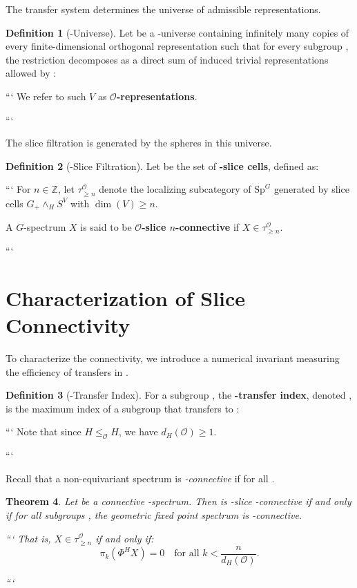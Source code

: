 \documentclass[11pt]{article}
\theoremstyle{plain}
\newtheorem{theorem}{Theorem}[section]
\theoremstyle{definition}
\newtheorem{definition}[theorem]{Definition}
\newcommand{\Ocal}{\mathcal{O}}
\newcommand{\SpG}{\mathrm{Sp}^G}
\newcommand{\Z}{\mathbb{Z}}
\newcommand{\slice}[1]{\tau_{\ge #1}^{\Ocal}}
\begin{document}
The transfer system determines the universe of admissible representations.

\begin{definition}[-Universe]
Let  be a -universe containing infinitely many copies of every finite-dimensional orthogonal representation  such that for every subgroup , the restriction  decomposes as a direct sum of induced trivial representations allowed by :

```
We refer to such $V$ as \textbf{$\Ocal$-representations}.

```

\end{definition}

The slice filtration is generated by the spheres in this universe.

\begin{definition}[-Slice Filtration]
Let  be the set of \textbf{-slice cells}, defined as:

```
For $n \in \Z$, let $\slice{n}$ denote the localizing subcategory of $\SpG$ generated by slice cells $G_+ \wedge_H S^V$ with $\dim(V) \ge n$.

A $G$-spectrum $X$ is said to be \textbf{$\Ocal$-slice $n$-connective} if $X \in \slice{n}$.

```

\end{definition}

\section{Characterization of Slice Connectivity}

To characterize the connectivity, we introduce a numerical invariant measuring the efficiency of transfers in .

\begin{definition}[-Transfer Index]
For a subgroup , the \textbf{-transfer index}, denoted , is the maximum index of a subgroup that transfers to :

```
Note that since $H \le_\Ocal H$, we have $d_H(\Ocal) \ge 1$.

```

\end{definition}

Recall that a non-equivariant spectrum  is \emph{-connective} if  for all .

\begin{theorem}
Let  be a connective -spectrum. Then  is -slice -connective if and only if for all subgroups , the geometric fixed point spectrum  is -connective.

```
That is, $X \in \slice{n}$ if and only if:
\[
    \pi_k(\Phi^H X) = 0 \quad \text{for all } k < \frac{n}{d_H(\Ocal)}.
\]

```

\end{theorem}
\end{document}
